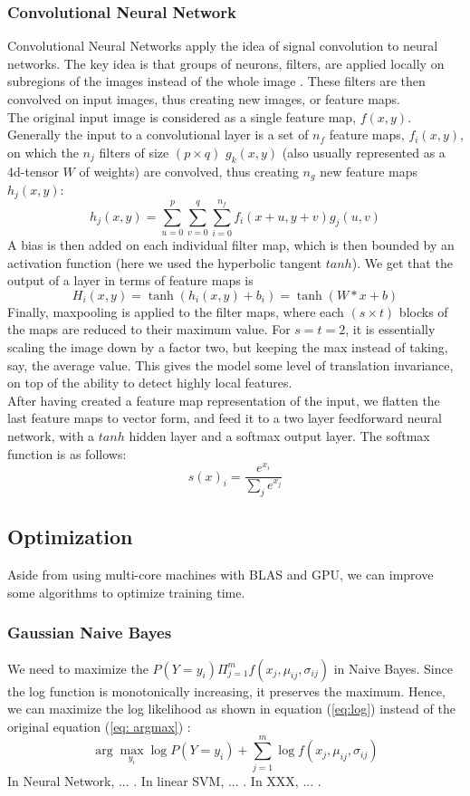 \documentclass{acm_proc_article-sp}
\begin{document}
\subsubsection{Convolutional Neural Network}
Convolutional Neural Networks apply the idea of signal convolution to neural networks. The key idea is that groups of neurons, filters, are applied locally on subregions of the images instead of the whole image \cite{726791}. These filters are then convolved on input images, thus creating new images, or feature maps.\\
The original input image is considered as a single feature map, $f(x,y)$. Generally the input to a convolutional layer is a set of $n_f$ feature maps, $f_i(x,y)$, on which the $n_j$ filters of size $(p\times q)$ $g_k(x,y)$ (also usually represented as a 4d-tensor $W$ of weights) are convolved, thus creating $n_g$ new feature maps $h_j(x,y)$:
$$ h_j(x,y) = \sum_{u=0}^p\sum_{v=0}^q\sum_{i=0}^{n_f} f_i(x+u,y+v)g_j(u,v) $$
A bias is then added on each individual filter map, which is then bounded by an activation function (here we used the hyperbolic tangent $tanh$). We get that the output of a layer in terms of feature maps is 
$$H_i(x,y) = \tanh(h_i(x,y) + b_i) = \tanh(W\ast x + b) $$
Finally, maxpooling is applied to the filter maps, where each $(s \times t)$ blocks of the maps are reduced to their maximum value. For $s=t=2$, it is essentially scaling the image down by a factor two, but keeping the max instead of taking, say, the average value. This gives the model some level of translation invariance, on top of the ability to detect highly local features.\\
After having created a feature map representation of the input, we flatten the last feature maps to vector form, and feed it to a two layer feedforward neural network, with a $tanh$ hidden layer and a softmax output layer. The softmax function is as follows:
$$ s(x)_i = \frac{e^{x_i}}{\sum_j e^{x_j}} $$


\subsection{Optimization}
Aside from using multi-core machines with BLAS and GPU, we can improve some algorithms to optimize training time. 


\subsubsection{Gaussian Naive Bayes}
We need to maximize the $P(Y = y_i) \Pi_{j=1}^m f (x_j, \mu_{ij}, \sigma_{ij} )$ in Naive Bayes. Since the log function is monotonically increasing, it preserves the maximum. Hence, we can maximize the log likelihood as shown in equation (\ref{eq:log}) instead of the original equation (\ref{eq: argmax}) :
\begin{equation}
\arg \max_{y_i} \log P(Y = y_i) + \sum_{j=1}^m \log f (x_j, \mu_{ij}, \sigma_{ij} ) \label{eq:log}
\end{equation}
In Neural Network, ... . In linear SVM, ... . In XXX, ... .
\end{document}
